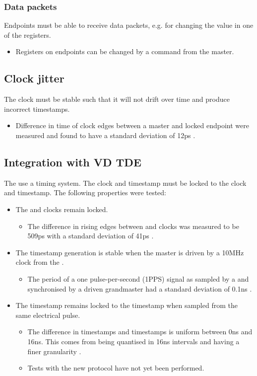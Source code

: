 \documentclass{dune}
\begin{document}
\subsubsection{Data packets}
Endpoints must be able to receive data packets, e.g. for changing the value in one of the registers.
\begin{itemize}
  \item Registers on endpoints can be changed by a command from the master.
\end{itemize}

\subsection{Clock jitter}
\label{sec:jitter}
The clock must be stable such that it will not drift over time and produce incorrect timestamps.
\begin{itemize}
  \item Difference in time of clock edges between a master and locked endpoint were measured and found to have a standard deviation of 12ps \cite{jitter}.
\end{itemize}

\subsection{Integration with VD TDE}
The   use a  timing system.
The  clock and timestamp must be locked to the  clock and timestamp.
The following properties were tested:
\begin{itemize}
  \item The  and  clocks remain locked.
  \begin{itemize}
    \item The difference in rising edges between  and  clocks was measured to be 509ps with a standard deviation of 41ps \cite{wr}.
  \end{itemize}
  \item The  timestamp generation is stable when the  master is driven by a 10MHz clock from the .
  \begin{itemize}
    \item The period of a one pulse-per-second (1PPS) signal as sampled by a   and synchronised by a  driven  grandmaster had a standard deviation of 0.1ns \cite{wr}.
  \end{itemize}
  \item The  timestamp remains locked to the  timestamp when sampled from the same electrical pulse.
  \begin{itemize}
    \item The difference in  timestamps and  timestamps is uniform between 0ns and 16ns. This comes from  being quantised in 16ns intervals and  having a finer granularity \cite{wr}.
    \item Tests with the new protocol have not yet been performed.
  \end{itemize}
\end{itemize}
\end{document}
